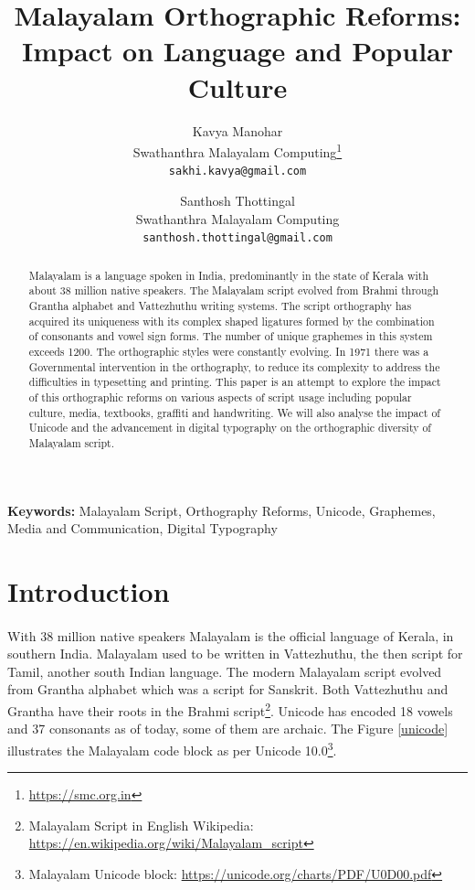 \documentclass[10pt]{article}
\title{Malayalam Orthographic Reforms: \\Impact on Language and Popular Culture}
\author{Kavya Manohar \\
\small{Swathanthra Malayalam Computing\footnote{\url{https://smc.org.in}}} \\
 {\small {\tt sakhi.kavya@gmail.com}} \\
 \and
 Santhosh Thottingal \\
 \small{Swathanthra Malayalam Computing} \\
 {\small {\tt santhosh.thottingal@gmail.com}}}
\begin{document}
\maketitle

\begin{abstract}

Malayalam is a language spoken in India, predominantly in the state of Kerala with about 38 million native speakers. The Malayalam script evolved from Brahmi through Grantha alphabet and Vattezhuthu writing systems. The script orthography has acquired its uniqueness with its complex shaped ligatures formed by the combination of consonants and vowel sign forms. The number of unique graphemes in this system exceeds 1200. The orthographic styles were constantly evolving. In 1971 there was a Governmental intervention in the orthography, to reduce its complexity to address the difficulties in typesetting and printing. This paper is an attempt to explore the impact of this orthographic reforms on various aspects of script usage including popular culture, media, textbooks, graffiti and handwriting. We will also analyse the impact of Unicode and the advancement in digital typography on the orthographic diversity of Malayalam script.

\end{abstract}
 \textbf{Keywords:} Malayalam Script, Orthography Reforms, Unicode, Graphemes, Media and Communication, Digital Typography

\section{Introduction}

\paragraph{}
With 38 million native speakers Malayalam is the official language of Kerala, in southern India. Malayalam used to be written in Vattezhuthu, the then script for Tamil, another south Indian language. The modern Malayalam script evolved from Grantha alphabet which was a script for Sanskrit. Both Vattezhuthu and Grantha have their roots in the Brahmi script\footnote{Malayalam Script in English Wikipedia: \url{https://en.wikipedia.org/wiki/Malayalam_script}}. Unicode has encoded 18 vowels and 37 consonants as of today, some of them are archaic.  The Figure \ref{unicode} illustrates the Malayalam code block as per Unicode 10.0\footnote{Malayalam Unicode block: \url{https://unicode.org/charts/PDF/U0D00.pdf}}. 
\end{document}
